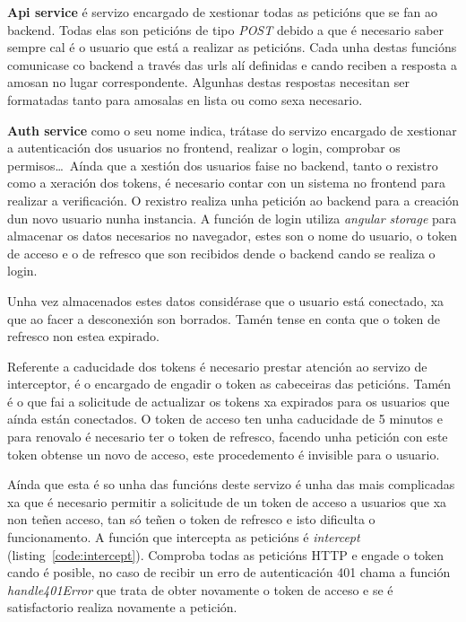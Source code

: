 \textbf{Api service} é servizo encargado de xestionar todas as peticións que se fan ao backend. Todas elas son peticións de tipo \textit{POST} debido a que é necesario saber sempre cal é o usuario que está a realizar as peticións. Cada unha destas funcións comunicase co backend a través das urls alí definidas e cando reciben a resposta a amosan no lugar correspondente. Algunhas destas respostas necesitan ser formatadas tanto para amosalas en lista ou como sexa necesario.

\textbf{Auth service} como o seu nome indica, trátase do servizo encargado de xestionar a autenticación dos usuarios no frontend, realizar o login, comprobar os permisos\dots~Aínda que a xestión dos usuarios faise no backend, tanto o rexistro como a xeración dos tokens, é necesario contar con un sistema no frontend para realizar a verificación.\smallbreak
O rexistro realiza unha petición ao backend para a creación dun novo usuario nunha instancia. A función de login utiliza \textit{angular storage} para almacenar os datos necesarios no navegador, estes son o nome do usuario, o token de acceso e o de refresco que son recibidos dende o backend cando se realiza o login.

Unha vez almacenados estes datos considérase que o usuario está conectado, xa que ao facer a desconexión son borrados. Tamén tense en conta que o token de refresco non estea expirado.

Referente a caducidade dos tokens é necesario prestar atención ao servizo de interceptor, é o encargado de engadir o token as cabeceiras das peticións. Tamén é o que fai a solicitude de actualizar os tokens xa expirados para os usuarios que aínda están conectados. O token de acceso ten unha caducidade de 5 minutos e para renovalo é necesario ter o token de refresco, facendo unha petición con este token obtense un novo de acceso, este procedemento é invisible para o usuario.

Aínda que esta é so unha das funcións deste servizo é unha das mais complicadas xa que é necesario permitir a solicitude de un token de acceso a usuarios que xa non teñen acceso, tan só teñen o token de refresco e isto dificulta o funcionamento. A función que intercepta as peticións é \textit{intercept} (listing~\ref{code:intercept}). Comproba todas as peticións \acrshort{HTTP} e engade o token cando é posible, no caso de recibir un erro de autenticación 401 chama a función \textit{handle401Error} que trata de obter novamente o token de acceso e se é satisfactorio realiza novamente a petición.\newpage

